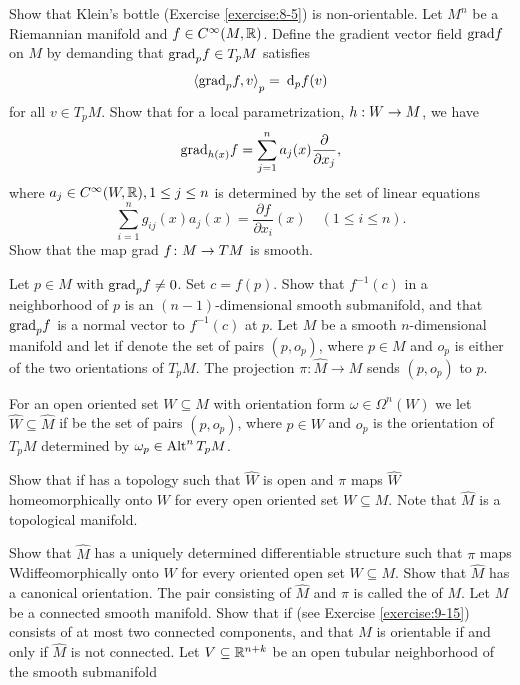 \begin{enumerate}[label=\theexercise.\arabic*.,ref=\theexercise.\arabic*,leftmargin=2.7em]
  \NewItem Show that Klein's bottle (Exercise \ref{exercise:8-5}) is non-orientable.
  \NewItem Let ${M}^{n}$ be a Riemannian manifold and $f \in  {C}^{\infty }( {M,{\mathbb{R}}})$. Define the gradient vector field $\mathrm{grad}f$ on $M$ by demanding that ${\mathrm{grad}}_{p}f \in  {T}_{p}M$ satisfies
    \[
      {\langle  {\R{grad}}_{p}f,v\rangle  }_{p} = {\dd}_{p}f( v)
    \]
    for all $v \in  {T}_{p}M$. Show that for a local parametrization, $h : W \rightarrow  M$, we
    have
    \[
      {\mathrm{grad}}_{h( x) }f = \sum_{{j = 1}}^{n}{a}_{j}( x) \frac{\partial }{\partial {x}_{j}},
    \]
    where ${a}_{j} \in  {C}^{\infty }( {W,\mathbb{R}}),1 \leq  j \leq  n$ is determined by the set of linear equations
    \[
      \sum_{i=1}^{n}{g}_{ij}( x) {a}_{j}( x)  = \frac{\partial f}{\partial {x}_{i}}( x) \quad( {1 \leq  i \leq  n}).
    \]
    Show that the map grad $f\colon M \rightarrow  {TM}$ is smooth.\par
    Let $p \in  M$ with ${\mathrm{grad}}_{p}f \neq  0$. Set $c = f( p)$. Show that ${f}^{-1}( c)$ in a neighborhood of $p$ is an $(n- 1)$-dimensional smooth submanifold, and that ${\mathrm{grad}}_{p}f$ is a normal vector to ${f}^{-1}( c)$ at $p$.
  \NewItem Let $M$ be a smooth $n$-dimensional manifold and let if denote the set of
    pairs $(p, o_p)$, where $p\in M$ and $o_p$ is either of the two orientations of $T_pM$. The projection
    $\pi:\hat M\to M$ sends $(p, o_p)$ to $p$.\par
    For an open oriented set $W\subseteq M$ with orientation form $\omega\in\Omega^n(W)$ we let
    $\hat W\subseteq\hat M$ if be the set of pairs $(p, o_p)$, where $p\in W$ and $o_p$ is the orientation
    of $T_pM$ determined by $\omega_p\in\operatorname{Alt}^nT_pM$.\par
    Show that if has a topology such that $\hat W$ is open and $\pi$ maps $\hat W$
    homeomorphically onto $W$ for every open oriented set $W\subseteq M$. Note
    that $\hat M$ is a topological manifold.\par
    Show that $\hat M$ has a uniquely determined differentiable structure such that
    $\pi$ maps Wdiffeomorphically onto $W$ for every oriented open set $W\subseteq M$.
    Show that $\hat M$ has a canonical orientation. The pair consisting of $\hat M$ and
    $\pi$ is called the  of $M$.
  \NewItem Let $M$ be a connected smooth manifold. Show that if (see Exercise \ref{exercise:9-15})
    consists of at most two connected components, and that $M$ is orientable if and only if $\hat M$ is not connected.
  \NewItem Let $V\subseteq{\ensuremath{\mathbb{R}}}^{n+k}$ be an open tubular neighborhood of the smooth submanifold

\end{enumerate}
